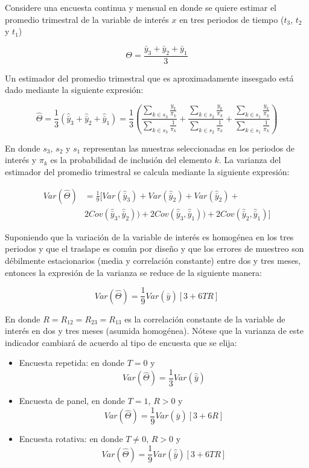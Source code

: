 \documentclass[
  12pt,
]{book}
\providecommand{\tightlist}{%
  \setlength{\itemsep}{0pt}\setlength{\parskip}{0pt}}
\begin{document}
Considere una encuesta continua y mensual en donde se quiere estimar el
promedio trimestral de la variable de interés \(x\) en tres periodos de
tiempo (\(t_3\), \(t_2\) y \(t_1\))

\[
\Theta = \frac{\bar{y}_3 + \bar{y}_2 + \bar{y}_1}{3}
\]

Un estimador del promedio trimestral que es aproximadamente insesgado está dado mediante la siguiente expresión:

\[
\hat{\Theta} = \frac{1}{3} \left( \hat{\bar{y}}_3 + \hat{\bar{y}}_2 + \hat{\bar{y}}_1 \right)
= \frac{1}{3}\left( \frac{\sum_{k\in s_3}\frac{y_{k}}{\pi_k}}{\sum_{k\in s_3}\frac{1}{\pi_k}} + \frac{\sum_{k\in s_2}\frac{y_{k}}{\pi_k}}{\sum_{k\in s_2}\frac{1}{\pi_k}} + \frac{\sum_{k\in s_1}\frac{y_{k}}{\pi_k}}{\sum_{k\in s_1}\frac{1}{\pi_k}} \right)
\]

En donde \(s_3\), \(s_2\) y \(s_1\) representan las muestras seleccionadas en
los periodos de interés y \(\pi_k\) es la probabilidad de inclusión del
elemento \(k\). La varianza del estimador del promedio trimestral se
calcula mediante la siguiente expresión:

\[
\begin{split}
Var(\hat{\Theta}) & = \frac{1}{9}[Var(\hat{\bar{y}}_3) + Var(\hat{\bar{y}}_2) + Var(\hat{\bar{y}}_2) + \\ 
&2Cov(\hat{\bar{y}}_3, \hat{\bar{y}}_2)) + 2Cov(\hat{\bar{y}}_3, \hat{\bar{y}}_1)) + 2Cov(\hat{\bar{y}}_2, \hat{\bar{y}}_1)]
\end{split}
\]

Suponiendo que la variación de la variable de interés es homogénea en
los tres periodos y que el traslape es común por diseño y que los errores
de muestreo son débilmente estacionarios (media y correlación constante) entre dos y tres meses,
entonces la expresión de la varianza se reduce de la siguiente manera:

\[
Var(\hat{\Theta}) = \frac{1}{9} Var(\hat{\bar{y}})[3 + 6TR]
\]

En donde \(R=R_{12}=R_{23}=R_{13}\) es la correlación constante de la variable de interés en dos y tres
meses (asumida homogénea). Nótese que la varianza de este indicador
cambiará de acuerdo al tipo de encuesta que se elija:

\begin{itemize}
\tightlist
\item
  Encuesta repetida: en donde \(T=0\) y
  \[Var(\hat{\Theta}) = \frac{1}{3} Var(\hat{\bar{y}})\]
\item
  Encuesta de panel, en donde \(T=1\), \(R > 0\) y
  \[Var(\hat{\Theta}) = \frac{1}{9} Var(\hat{\bar{y}}) [3+6R]\]
\item
  Encuesta rotativa: en donde \(T\neq 0\), \(R > 0\) y
  \[Var(\hat{\Theta}) = \frac{1}{9} Var(\hat{\bar{y}}) [3+6TR]\]
\end{itemize}
\end{document}
